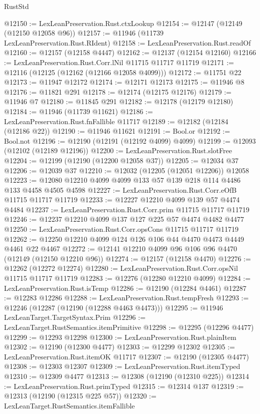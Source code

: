 \begin{lexlean}{RustStd}
\begin{coremodule}
@12150 := LexLeanPreservation.Rust.ctxLookup
@12154 := @12147 (@12149 (@12150 @12058 @96))
@12157 := @11946 (@11739 LexLeanPreservation.Rust.RIdent)
@12158 := LexLeanPreservation.Rust.readOf
@12160 := @12157 (@12158 @4447)
@12162 := @12137 (@12154 @12160)
@12166 := LexLeanPreservation.Rust.Corr.lNil @11715 @11717 @11719
@12171 := @12116 (@12125 (@12162 (@12166 @12058 @4099)))
@12172 := @11751 @22
@12173 := @11947 @12172
@12174 := @12171 @12173
@12175 := @11946 @8
@12176 := @11821 @291
@12178 := @12174 (@12175 @12176)
@12179 := @11946 @7
@12180 := @11845 @291
@12182 := @12178 (@12179 @12180)
@12184 := @11946 (@11739 @11621)
@12186 := LexLeanPreservation.Rust.fnFallible @11717
@12189 := @12182 (@12184 (@12186 @22))
@12190 := @11946 @11621
@12191 := Bool.or
@12192 := Bool.not
@12196 := @12190 (@12191 (@12192 @4099) @4099)
@12199 := @12093 (@12102 (@12189 @12196))
@12200 := LexLeanPreservation.Rust.slotFree
@12204 := @12199 (@12190 (@12200 @12058 @37))
@12205 := @12034 @37
@12206 := @12039 @37
@12210 := @12032 (@12205 (@12051 @12206)) @12058
@12223 := @12080 @12210 @4099 @4099 @133 @57 @139 @218 @114 @4486 @133 @4458 @4505 @4598
@12227 := LexLeanPreservation.Rust.Corr.eOfB @11715 @11717 @11719
@12233 := @12227 @12210 @4099 @139 @57 @4474 @4484
@12237 := LexLeanPreservation.Rust.Corr.prim @11715 @11717 @11719
@12246 := @12237 @12210 @4099 @137 @127 @225 @57 @4474 @4482 @4477
@12250 := LexLeanPreservation.Rust.Corr.opsCons @11715 @11717 @11719
@12262 := @12250 @12210 @4099 @124 @126 @106 @44 @4470 @4473 @4449 @4461 @22 @4467
@12272 := @12141 @12210 @4099 @96 @106 @96 @4470 (@12149 (@12150 @12210 @96))
@12274 := @12157 (@12158 @4470)
@12276 := @12262 (@12272 @12274)
@12280 := LexLeanPreservation.Rust.Corr.opsNil @11715 @11717 @11719
@12283 := @12276 (@12280 @12210 @4099)
@12284 := LexLeanPreservation.Rust.isTemp
@12286 := @12190 (@12284 @4461)
@12287 := @12283 @12286
@12288 := LexLeanPreservation.Rust.tempFresh
@12293 := @12246 (@12287 (@12190 (@12288 @4463 @4473)))
@12295 := @11946 LexLeanTarget.TargetSyntax.Prim
@12296 := LexLeanTarget.RustSemantics.itemPrimitive
@12298 := @12295 (@12296 @4477)
@12299 := @12293 @12298
@12300 := LexLeanPreservation.Rust.plainItem
@12302 := @12190 (@12300 @4477)
@12303 := @12299 @12302
@12305 := LexLeanPreservation.Rust.itemOK @11717
@12307 := @12190 (@12305 @4477)
@12308 := @12303 @12307
@12309 := LexLeanPreservation.Rust.itemTyped
@12310 := @12309 @4477
@12313 := @12308 (@12190 (@12310 @225))
@12314 := LexLeanPreservation.Rust.primTyped
@12315 := @12314 @137
@12319 := @12313 (@12190 (@12315 @225 @57))
@12320 := LexLeanTarget.RustSemantics.itemFallible

\end{coremodule}
\end{lexlean}

